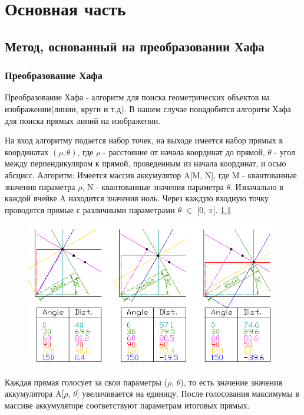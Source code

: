 \chapter{Основная часть}
\section{Метод, основанный на преобразовании Хафа}
\subsection{Преобразование Хафа}
\label{hough}
Преобразование Хафа \cite{b:hough_transform} - алгоритм для поиска геометрических объектов на изображении(линии, круги и т.д). В нашем случае понадобится алгоритм Хафа для поиска прямых линий на изображении. 

На вход алгоритму подается набор точек, на выходе имеется набор прямых в координатах $(\rho, \theta)$, где $\rho$ - расстояние от начала координат до прямой, $\theta$ - угол между перпендикуляром к прямой, проведенным из начала координат, и осью абсцисс.
\newline
Алгоритм:
\newline
Имеется массив аккумулятор A[M, N], где M - квантованные значения параметра $\rho$, N - квантованные значения параметра $\theta$. Изначально в каждой ячейке A находится значения ноль.
\newline
Через каждую входную точку проводятся прямые с различными параметрами $\theta$ $\in$ [0, $\pi$]. \ref{fig:hough1}

\begin{figure}[h!]
	\centering
	\includegraphics[width=0.7\linewidth]{pictures/hough1}
	\caption[Алгоритм Хафа]{}
	\label{fig:hough1}
\end{figure}

Каждая прямая голосует за свои параметры ($\rho$, $\theta$), то есть значение значения аккумулятора A[$\rho$, $\theta$] увеличивается на единицу. 
После голосования максимумы в массиве аккумуляторе соответствуют параметрам итоговых прямых. 

